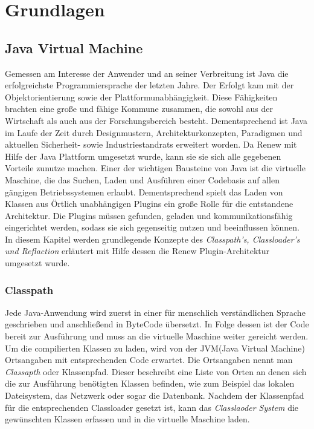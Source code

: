 \chapter{Grundlagen} 
\label{cha:Grundlagen}


\section{Java Virtual Machine} 
\label{sec:Java Virtual Machine}
Gemessen am Interesse der Anwender und an seiner Verbreitung ist Java die erfolgreichste Programmiersprache der letzten Jahre. Der Erfolgt kam mit der Objektorientierung sowie der Plattformunabhängigkeit. Diese Fähigkeiten brachten eine große und fähige Kommune zusammen, die sowohl aus der Wirtschaft als auch aus der Forschungsbereich besteht. Dementsprechend ist Java im Laufe der Zeit durch Designmustern, Architekturkonzepten, Paradigmen und aktuellen Sicherheit- sowie Industriestandrats erweitert worden. Da Renew mit Hilfe der Java Plattform umgesetzt wurde, kann sie sie sich alle gegebenen Vorteile zunutze machen. 
Einer der wichtigen Bausteine von Java ist die virtuelle Maschine, die das Suchen, Laden und Ausführen einer Codebasis auf allen gängigen Betriebssystemen erlaubt. Dementsprechend spielt das Laden von Klassen aus Örtlich unabhängigen Plugins ein große Rolle für die entstandene Architektur. Die Plugins müssen gefunden, geladen und kommunikationsfähig eingerichtet werden, sodass sie sich gegenseitig nutzen und beeinflussen können. \newline 
In diesem Kapitel werden grundlegende Konzepte des \textit{ Classpath's, Classloader's und Reflaction} erläutert mit Hilfe dessen die Renew Plugin-Architektur umgesetzt wurde.

\subsection{Classpath}
\label{sub:Classpath}
Jede Java-Anwendung wird zuerst in einer für menschlich verständlichen Sprache geschrieben und anschließend in ByteCode übersetzt. In Folge dessen ist der Code bereit zur Ausführung und muss an die virtuelle Maschine weiter gereicht werden.\newline
Um die compilierten Klassen zu laden, wird von der JVM(Java Virtual Machine) Ortsangaben mit entsprechenden Code erwartet. Die Ortsangaben nennt man \textit{Classapth} oder Klassenpfad. Dieser beschreibt eine Liste von Orten an denen sich die zur Ausführung benötigten Klassen befinden, wie zum Beispiel das lokalen Dateisystem, das Netzwerk oder sogar die Datenbank. Nachdem der Klassenpfad für die entsprechenden Classloader gesetzt ist, kann das \textit{Classlaoder System} die gewünschten Klassen erfassen und in die virtuelle Maschine laden.

